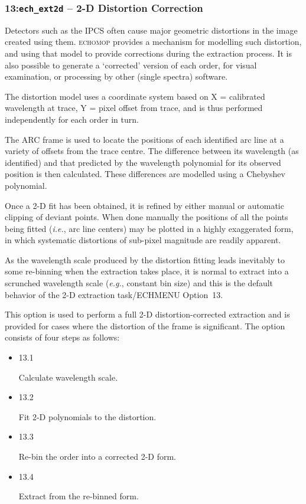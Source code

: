 \documentclass[twoside,11pt,nolof]{starlink}
\newcommand{\myindex}[1]{\index{#1}}
\newcommand{\indexcmdname}[1]{\index{\begingroup \catcode`\_=12 \texttt{#1} \endgroup}}
\newcommand{\echtask}[4]
           {
             \subsubsection*{#3  -- #4}
             \xlabel{#1}\xlabel{#2}\label{#1}\label{#2}
             \indexcmdname{#2}
}
\begin{document}
\echtask{option13}{ech_ext2d}{13:{\tt ech\_ext2d}}{2-D Distortion Correction}

\myindex{2-D distortion}

Detectors such as the IPCS often cause major geometric distortions in
the image created using them. \textsc{echomop} provides a mechanism for
modelling such distortion, and using that model to provide corrections
during the extraction process. It is also possible to generate a
`corrected' version of each order,  for visual examination,  or
processing by other (single spectra) software.

The distortion model uses a coordinate system based on X =
calibrated wavelength at trace, Y = pixel offset from trace, and is
thus performed independently for each order in turn.

The ARC frame is used to locate the positions of each identified arc
line at a variety of offsets from the trace centre. The difference
between its wavelength (as identified) and that predicted by the
wavelength polynomial for its observed position is then calculated.
These differences are modelled using a Chebyshev polynomial.

Once a 2-D fit has been obtained,  it is refined by either manual or
automatic clipping of deviant points. When done manually the
positions of all the points being fitted ({\textit{i.e.}}, arc line
centers) may be plotted in a highly exaggerated form, in which
systematic distortions of sub-pixel magnitude are readily apparent.

As the wavelength scale produced by the distortion fitting leads
inevitably to some re-binning when the extraction takes place, it is
normal to extract into a scrunched wavelength scale ({\textit{e.g.}},
constant bin size) and this is the default behavior of the 2-D
extraction task/ECHMENU Option~13.

This option is used to perform a full 2-D distortion-corrected
extraction and is provided for cases where the distortion of the
frame is significant. The option consists of four steps as follows:

\begin{itemize}

\item {13.1}

      Calculate wavelength scale.

\item {13.2}

      Fit 2-D polynomials to the distortion.

\item {13.3}

      Re-bin the order into a corrected 2-D form.

\item {13.4}

      Extract from the re-binned form.

\end{itemize}
\end{document}
